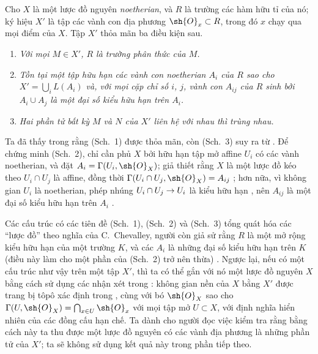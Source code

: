 \documentclass[oneside]{amsart}
\makeatletter
\newcommand{\ega@arrow}[2]{\mathchoice{#1}{#2}{#2}{#2}}
\renewcommand{\to}{\ega@arrow{\longrightarrow}{\rightarrow}}
\newcommand{\oldpage}[2][]{{\marginnote{\normalfont\textbf{#1}~|~#2}}\ignorespaces}
\let\EGAOriginalLabel\label
\renewcommand{\label}[1]{\phantomsection\EGAOriginalLabel{#1}}
\makeatother
\begin{document}
\begin{env}[8.3.1]
\label{I.8.3.1}
Cho $X$ là một lược đồ nguyên \emph{noetherian}, và $R$ là trường các hàm hữu tỉ của nó;
ký hiệu $X'$ là tập các vành con địa phương $\sh{O}_x\subset R$, trong đó $x$ chạy qua mọi điểm của $X$.
Tập $X'$ thỏa mãn ba điều kiện sau.
\begin{enumerate}
  \item[(Sch.~1)] \emph{Với mọi $M\in X'$, $R$ là trường phân thức của $M$.}
  \item[(Sch.~2)] \emph{Tồn tại một tập hữu hạn các vành con noetherian $A_i$ của $R$ sao cho $X'=\bigcup_i L(A_i)$ và, với mọi cặp chỉ số $i$, $j$, vành con $A_{ij}$ của $R$ sinh bởi $A_i\cup A_j$ là một đại số kiểu hữu hạn trên $A_i$.}
  \item[(Sch.~3)] \emph{Hai phần tử bất kỳ $M$ và $N$ của $X'$ liên hệ với nhau thì trùng nhau.}
\end{enumerate}
\end{env}

Ta đã thấy trong  rằng (Sch.~1) được thỏa mãn, còn (Sch.~3) suy ra từ .
Để chứng minh (Sch.~2), chỉ cần phủ $X$ bởi hữu hạn tập mở affine $U_i$ có các vành noetherian, và đặt $A_i=\Gamma(U_i,\sh{O}_X)$;
giả thiết rằng $X$ là một lược đồ kéo theo $U_i\cap U_j$ là affine, đồng thời $\Gamma(U_i\cap U_j,\sh{O}_X)=A_{ij}$ ;
hơn nữa, vì không gian $U_i$ là noetherian, phép nhúng $U_i\cap U_j\to U_i$ là kiểu hữu hạn , nên $A_{ij}$ là một đại số kiểu hữu hạn trên $A_i$ .

\begin{env}[8.3.2]
\label{I.8.3.2}
Các cấu trúc có các tiên đề (Sch.~1), (Sch.~2) và (Sch.~3) tổng quát hóa các ``lược đồ'' theo nghĩa của C.~Chevalley, người còn giả sử rằng $R$ là một mở rộng kiểu hữu hạn của một trường $K$, và các $A_i$ là những đại số kiểu hữu hạn trên $K$ (điều này làm cho một phần của (Sch.~2) trở nên thừa) \cite{I-1}.
Ngược lại, nếu có một cấu trúc như vậy trên một tập $X'$, thì ta có thể gắn với nó một lược đồ nguyên $X$ bằng cách sử dụng các nhận xét trong : không gian nền của $X$ bằng $X'$ được trang bị tôpô xác định trong , cùng với bó $\sh{O}_X$
\oldpage[I]{169}
sao cho $\Gamma(U,\sh{O}_X)=\bigcap_{x\in U}\sh{O}_x$ với mọi tập mở $U\subset X$, với định nghĩa hiển nhiên của các đồng cấu hạn chế.
Ta dành cho người đọc việc kiểm tra rằng bằng cách này ta thu được một lược đồ nguyên có các vành địa phương là những phần tử của $X'$;
ta sẽ không sử dụng kết quả này trong phần tiếp theo.
\end{env}
\end{document}
